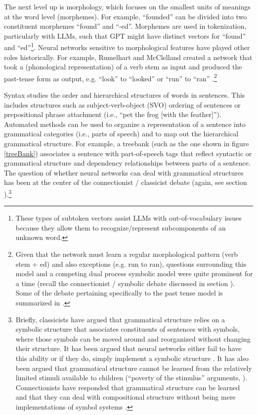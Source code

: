 The next level up is morphology, which focuses on the smallest units of meanings at the word level (morphemes). For example, ``founded'' can be divided into two constituent morphemes ``found'' and ``-ed''.  Morphemes are used in tokenization, particularly with LLMs, such that GPT might have distinct vectors for ``found'' and ``ed''\footnote{These types of subtoken vectors assist LLMs with out-of-vocabulary issues because they allow them to recognize/represent subcomponents of an unknown word.}.  Neural networks sensitive to morphological features have played other roles historically. For example, Rumelhart and McClelland created a network that took a (phonological representation) of a verb stem as input and produced the past-tense form as output, e.g. ``look'' to ``looked'' or ``run'' to ``ran'' \cite{rumelhart1986learning}.\footnote{Given that the network must learn a regular morphological pattern (verb stem + ed) and also exceptions (e.g. run to ran), questions surrounding this model and a competing dual process symbolic model were quite prominent for a time (recall the connectionist / symbolic debate discussed in section ). Some of the debate pertaining specifically to the past tense model is summarized in \cite{pinker2002past}.}  

Syntax studies the order and hierarchical structures of words in sentences. This includes structures such as subject-verb-object (SVO) ordering of sentences or prepositional phrase attachment (i.e., ``pet the frog [with the feather]''). Automated methods can be used to organize a representation of a sentence into grammatical categories (i.e., parts of speech) and to map out the hierarchical grammatical structure. For example, a treebank (such as the one shown in figure \ref{treeBank}) associates a sentence with part-of-speech tags that reflect syntactic or grammatical structure and dependency relationships between parts of a sentence. The question of whether neural networks can deal with grammatical structures has been at the center of the connectionist / classicist debate (again, see section ).\footnote{Briefly, classicists have argued that grammatical structure relies on a symbolic structure that associates constituents of sentences with symbols, where those symbols can be moved around and reorganized without changing their structure. It has been argued that neural networks either fail to have this ability or if they do, simply implement a symbolic structure \cite{fodor1988connectionism}. It has also been argued that grammatical structure cannot be learned from the relatively limited stimuli available to children (``poverty of the stimulus'' arguments, \cite{berwick2011poverty}). Connectionists have responded that grammatical structure can be learned \cite{elman1996rethinking} and that they can deal with compositional structure without being mere implementations of symbol systems \cite{smolensky1988proper}.}

